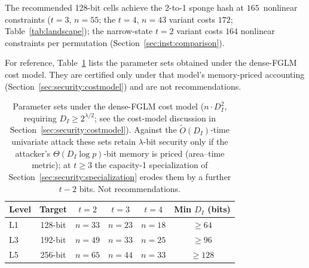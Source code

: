 \documentclass[11pt,a4paper]{article}
\theoremstyle{definition}
\begin{document}
The recommended 128-bit cells achieve the 2-to-1 sponge hash at
$165$~nonlinear constraints ($t=3$, $n=55$; the $t=4$, $n=43$ variant
costs $172$; Table~\ref{tab:landscape}); the narrow-state $t=2$
variant costs $164$ nonlinear constraints per permutation
(Section~\ref{sec:inst:comparison}).

For reference, Table~\ref{tab:tiers_fglm} lists the parameter sets
obtained under the dense-FGLM cost model. They are certified only
under that model's memory-priced accounting
(Section~\ref{sec:security:costmodel}) and are not recommendations.

\begin{table}[h]
\centering
\caption{Parameter sets under the dense-FGLM cost model
($n \cdot D_I^2$, requiring $D_I \ge 2^{\lambda/2}$; see the
cost-model discussion in Section~\ref{sec:security:costmodel}).
Against the $\widetilde{O}(D_I)$-time univariate attack these sets
retain $\lambda$-bit security only if the attacker's
$\Theta(D_I \log p)$-bit memory is priced (area--time metric); at
$t \ge 3$ the capacity-1 specialization of
Section~\ref{sec:security:specialization} erodes them by a further
$t-2$ bits. Not recommendations.}
\label{tab:tiers_fglm}
\begin{tabular}{@{}lccccc@{}}
\toprule
Level & Target & $t=2$ & $t=3$ & $t=4$ & Min $D_I$ (bits) \\
\midrule
L1 & 128-bit & $n{=}33$ & $n{=}23$ & $n{=}18$ & $\ge 64$ \\
L3 & 192-bit & $n{=}49$ & $n{=}33$ & $n{=}25$ & $\ge 96$ \\
L5 & 256-bit & $n{=}65$ & $n{=}44$ & $n{=}33$ & $\ge 128$ \\
\bottomrule
\end{tabular}
\end{table}
\end{document}
